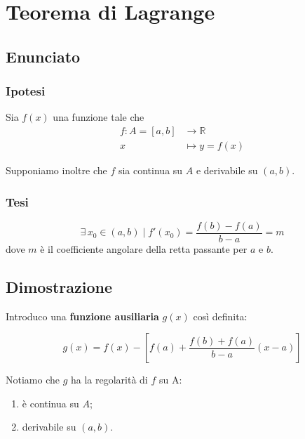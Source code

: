 \documentclass[../dimostrazioni]{subfiles}
\begin{document}
    \chapter{Teorema di Lagrange}
    \label{teoLagrange}

        \section*{Enunciato}

            \subsection*{Ipotesi}

                Sia \(f(x)\) una funzione tale che
                \begin{align*}
                    f : A = [a, b] &\longrightarrow \mathbb{R}\\
                    x &\longmapsto y = f(x) 
                \end{align*}

                Supponiamo inoltre che \(f\) sia continua su \(A\) e derivabile su \((a, b)\).

            \subsection*{Tesi}

                \[ \exists \, x_0 \in (a,b) \; | \; f'(x_0) = \frac{f(b)-f(a)}{b-a}=m \]
                dove \(m\) è il coefficiente angolare della retta passante per \(a\) e \(b\).

        \section*{Dimostrazione}

            Introduco una \textbf{funzione ausiliaria} \(g(x)\) così definita:

            \[ g(x) = f(x) - \left[f(a) + \frac{f(b) + f(a)}{b - a}(x - a) \right] \]

            Notiamo che \(g\) ha la regolarità di \(f\) su A:
            \begin{enumerate}
                \indentitem \item è continua su \( A \);
                \indentitem \item derivabile su \( (a, b) \).
            \end{enumerate}
\end{document}
